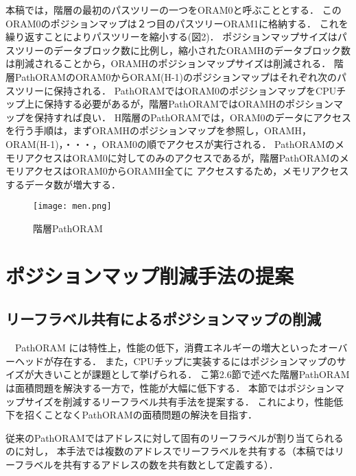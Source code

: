 \documentclass{jarticle}
\begin{document}
本稿では，階層の最初のパスツリーの一つをORAM0と呼ぶこととする．
このORAM0のポジションマップは２つ目のパスツリーORAM1に格納する．
これを繰り返すことによりパスツリーを縮小する(図2)．
ポジションマップサイズはパスツリーのデータブロック数に比例し，縮小されたORAMHのデータブロック数は削減されることから，ORAMHのポジションマップサイズは削減される．
階層PathORAMのORAM0からORAM(H-1)のポジションマップはそれぞれ次のパスツリーに保持される．
PathORAMではORAM0のポジションマップをCPUチップ上に保持する必要があるが，階層PathORAMではORAMHのポジションマップを保持すれば良い．
H階層のPathORAMでは，ORAM0のデータにアクセスを行う手順は，まずORAMHのポジションマップを参照し，ORAMH，ORAM(H-1)，・・・，ORAM0の順でアクセスが実行される．
PathORAMのメモリアクセスはORAM0に対してのみのアクセスであるが，階層PathORAMのメモリアクセスはORAM0からORAMH全てに
アクセスするため，メモリアクセスするデータ数が増大する．

\begin{figure}[t]
  \begin{center}
  \texttt{[image: men.png]}
  \caption{階層PathORAM}
  \label{tredsass}
  \end{center}
\end{figure}

\section{ポジションマップ削減手法の提案}
\subsection{リーフラベル共有によるポジションマップの削減}
　PathORAM には特性上，性能の低下，消費エネルギーの増大といったオーバーヘッドが存在する．
 また，CPUチップに実装するにはポジションマップのサイズが大きいことが課題として挙げられる．
 こ第2.6節で述べた階層PathORAMは面積問題を解決する一方で，性能が大幅に低下する．
 本節ではポジションマップサイズを削減するリーフラベル共有手法を提案する．
 これにより，性能低下を招くことなくPathORAMの面積問題の解決を目指す．

 従来のPathORAMではアドレスに対して固有のリーフラベルが割り当てられるのに対し，
 本手法では複数のアドレスでリーフラベルを共有する（本稿ではリーフラベルを共有するアドレスの数を共有数として定義する）．
\end{document}

